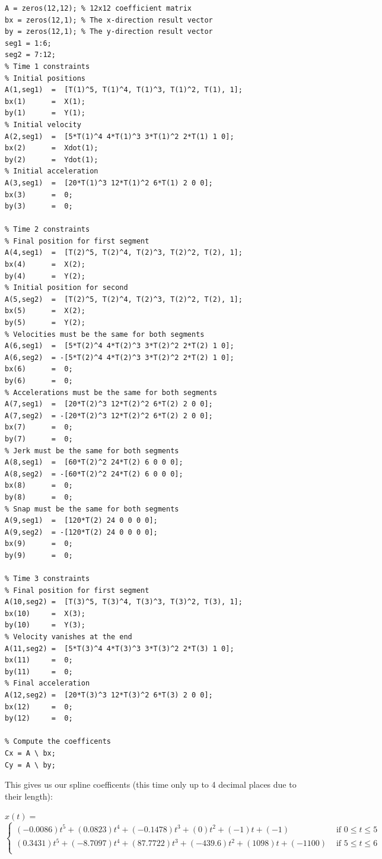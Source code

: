 \documentclass[english]{article}
\begin{document}
\begin{enumerate}
\begin{lstlisting}
A = zeros(12,12); % 12x12 coefficient matrix
bx = zeros(12,1); % The x-direction result vector
by = zeros(12,1); % The y-direction result vector
seg1 = 1:6;
seg2 = 7:12;
% Time 1 constraints
% Initial positions
A(1,seg1)  =  [T(1)^5, T(1)^4, T(1)^3, T(1)^2, T(1), 1]; 
bx(1)      =  X(1);
by(1)      =  Y(1);
% Initial velocity
A(2,seg1)  =  [5*T(1)^4 4*T(1)^3 3*T(1)^2 2*T(1) 1 0];
bx(2)      =  Xdot(1);
by(2)      =  Ydot(1);
% Initial acceleration
A(3,seg1)  =  [20*T(1)^3 12*T(1)^2 6*T(1) 2 0 0];
bx(3)      =  0;
by(3)      =  0;

% Time 2 constraints
% Final position for first segment
A(4,seg1)  =  [T(2)^5, T(2)^4, T(2)^3, T(2)^2, T(2), 1];
bx(4)      =  X(2);
by(4)      =  Y(2);
% Initial position for second
A(5,seg2)  =  [T(2)^5, T(2)^4, T(2)^3, T(2)^2, T(2), 1];
bx(5)      =  X(2);
by(5)      =  Y(2);
% Velocities must be the same for both segments
A(6,seg1)  =  [5*T(2)^4 4*T(2)^3 3*T(2)^2 2*T(2) 1 0];
A(6,seg2)  = -[5*T(2)^4 4*T(2)^3 3*T(2)^2 2*T(2) 1 0];
bx(6)      =  0;
by(6)      =  0;
% Accelerations must be the same for both segments
A(7,seg1)  =  [20*T(2)^3 12*T(2)^2 6*T(2) 2 0 0];
A(7,seg2)  = -[20*T(2)^3 12*T(2)^2 6*T(2) 2 0 0];
bx(7)      =  0;
by(7)      =  0;
% Jerk must be the same for both segments
A(8,seg1)  =  [60*T(2)^2 24*T(2) 6 0 0 0];
A(8,seg2)  = -[60*T(2)^2 24*T(2) 6 0 0 0];
bx(8)      =  0;
by(8)      =  0;
% Snap must be the same for both segments
A(9,seg1)  =  [120*T(2) 24 0 0 0 0];
A(9,seg2)  = -[120*T(2) 24 0 0 0 0];
bx(9)      =  0;
by(9)      =  0;

% Time 3 constraints
% Final position for first segment
A(10,seg2) =  [T(3)^5, T(3)^4, T(3)^3, T(3)^2, T(3), 1];
bx(10)     =  X(3);
by(10)     =  Y(3);
% Velocity vanishes at the end
A(11,seg2) =  [5*T(3)^4 4*T(3)^3 3*T(3)^2 2*T(3) 1 0];
bx(11)     =  0;
by(11)     =  0;
% Final acceleration
A(12,seg2) =  [20*T(3)^3 12*T(3)^2 6*T(3) 2 0 0];
bx(12)     =  0;
by(12)     =  0;

% Compute the coefficents
Cx = A \ bx;
Cy = A \ by;

\end{lstlisting}

This gives us our spline coefficents (this time only up to 4 decimal places due to their length):

\(x(t) = \)
\[
\begin{cases}
(-0.0086)t^5 + (0.0823)t^4 + (-0.1478)t^3 + (0)t^2 + (-1)t + (-1) & \textrm{ if } 0 \leq t \leq 5 \\
(0.3431)t^5 + (-8.7097)t^4 + (87.7722)t^3 + (-439.6)t^2 + (1098)t + (-1100) & \textrm{ if } 5 \leq t \leq 6 \\
\end{cases}
\]


\end{enumerate}
\end{document}
